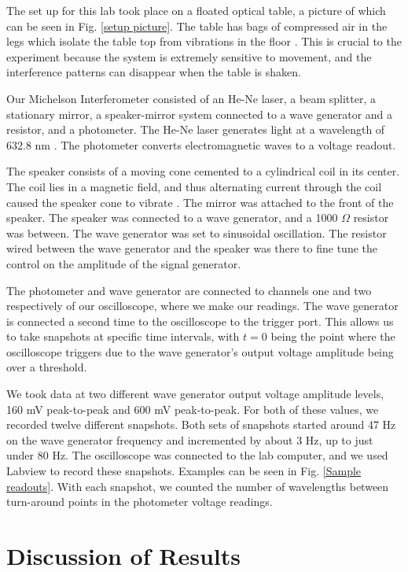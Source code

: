 \documentclass[11pt,letterpaper]{article}
\begin{document}
The set up for this lab took place on a floated optical table, a picture of which can be seen in Fig. \ref{setup picture}. The table has bags of compressed air in the legs which isolate the table top from vibrations in the floor \cite{Michelson}. This is crucial to the experiment because the system is extremely sensitive to movement, and the interference patterns can disappear when the table is shaken. 

Our Michelson Interferometer consisted of an He-Ne laser, a beam splitter, a stationary mirror, a speaker-mirror system connected to a wave generator and a resistor, and a photometer. The He-Ne laser generates light at a wavelength of 632.8 nm \cite{Telford}. The photometer converts electromagnetic waves to a voltage readout. 

The speaker consists of a moving cone cemented to a cylindrical coil in its center. The coil lies in a magnetic field, and thus alternating current through the coil caused the speaker cone to vibrate \cite{Freschi}. The mirror was attached to the front of the speaker. The speaker was connected to a wave generator, and a 1000 $\Omega$ resistor was between. The wave generator was set to sinusoidal oscillation. The resistor wired between the wave generator and the speaker was there to fine tune the control on the amplitude of the signal generator.

The photometer and wave generator are connected to channels one and two respectively of our oscilloscope, where we make our readings. The wave generator is connected a second time to the oscilloscope to the trigger port. This allows us to take snapshots at specific time intervals, with $t=0$ being the point where the oscilloscope triggers due to the wave generator's output voltage amplitude being over a threshold.

We took data at two different wave generator output voltage amplitude levels, 160 mV peak-to-peak and 600 mV peak-to-peak. For both of these values, we recorded twelve different snapshots. Both sets of snapshots started around 47 Hz on the wave generator frequency and incremented by about 3 Hz, up to just under 80 Hz. The oscilloscope was connected to the lab computer, and we used Labview to record these snapshots. Examples can be seen in Fig. \ref{Sample readouts}. With each snapshot, we counted the number of wavelengths between turn-around points in the photometer voltage readings.


\section{Discussion of Results}
\end{document}
